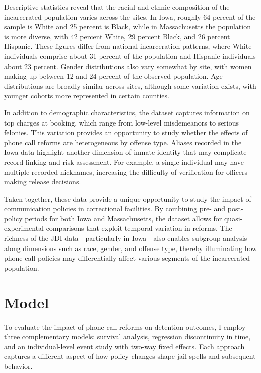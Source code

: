 \documentclass[12pt, a4paper]{article}
\begin{document}
Descriptive statistics reveal that the racial and ethnic composition of the incarcerated population varies across the sites. In Iowa, roughly 64 percent of the sample is White and 25 percent is Black, while in Massachusetts the population is more diverse, with 42 percent White, 29 percent Black, and 26 percent Hispanic. These figures differ from national incarceration patterns, where White individuals comprise about 31 percent of the population and Hispanic individuals about 23 percent. Gender distributions also vary somewhat by site, with women making up between 12 and 24 percent of the observed population. Age distributions are broadly similar across sites, although some variation exists, with younger cohorts more represented in certain counties.

In addition to demographic characteristics, the dataset captures information on top charges at booking, which range from low-level misdemeanors to serious felonies. This variation provides an opportunity to study whether the effects of phone call reforms are heterogeneous by offense type. Aliases recorded in the Iowa data highlight another dimension of inmate identity that may complicate record-linking and risk assessment. For example, a single individual may have multiple recorded nicknames, increasing the difficulty of verification for officers making release decisions.

Taken together, these data provide a unique opportunity to study the impact of communication policies in correctional facilities. By combining pre- and post-policy periods for both Iowa and Massachusetts, the dataset allows for quasi-experimental comparisons that exploit temporal variation in reforms. The richness of the JDI data—particularly in Iowa—also enables subgroup analysis along dimensions such as race, gender, and offense type, thereby illuminating how phone call policies may differentially affect various segments of the incarcerated population.

\section{Model}

To evaluate the impact of phone call reforms on detention outcomes, I employ three complementary models: survival analysis, regression discontinuity in time, and an individual-level event study with two-way fixed effects. Each approach captures a different aspect of how policy changes shape jail spells and subsequent behavior.
\end{document}
